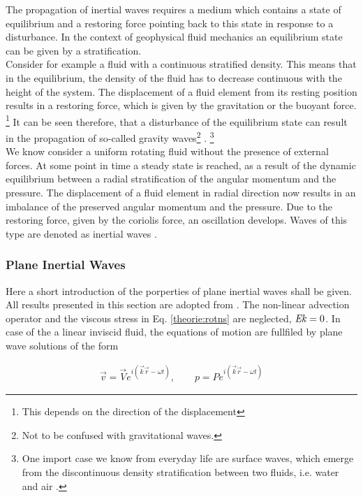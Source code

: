 The propagation of inertial waves requires a medium which contains a state of equilibrium and
a restoring force pointing back to this state in response to a disturbance.
In the context of geophysical fluid mechanics an equilibrium state can be given by a stratification.\\
Consider for example a fluid with a continuous stratified density.
This means that in the equilibrium, the density of the fluid has to decrease
continuous with the height of the system. The displacement of a fluid element
 from its resting position results in a restoring force, which is  given by the
gravitation or the buoyant force.
\footnote{This depends on the direction of the displacement}
It can be seen therefore, that a disturbance of the equilibrium state can result in the
propagation of so-called  gravity waves\footnote{Not to be confused with gravitational waves.} \cite{Clausen2011}.
\footnote{One import case we know from everyday life are surface waves, which emerge
from the discontinuous density stratification between two fluids, i.e. water and air \cite{Clausen2011}.}\\
We know consider a uniform rotating fluid without the presence of external forces.
At some point in time a steady state is reached, as a result of the dynamic equilibrium between
a radial stratification of the angular momentum and the pressure.
The displacement of a fluid element in radial direction now results in
an imbalance of the preserved angular momentum and the pressure.
Due to the restoring force, given by the coriolis force, an oscillation develops.
Waves of this type are denoted as inertial waves \cite{Clausen2011}.

\subsubsection{Plane Inertial Waves}

Here a short introduction of the porperties of plane inertial waves shall be given.
All results presented in this section are adopted from \citep{Greenspan1990}.%
The non-linear advection operator and the viscous stress in Eq. \ref{theorie:rotns} are neglected, $\mbox{\textit{Ek}} =0$.
In case of the a linear inviscid fluid, the equations of motion are fullfiled by plane wave solutions of the form

\begin{align}
    \vec{v} = \vec{V} e^{i(\vec{k}\vec{r}  - \omega t )}, \qquad
    p = P e^{i(\vec{k}\vec{r}  - \omega t )}
\end{align}

